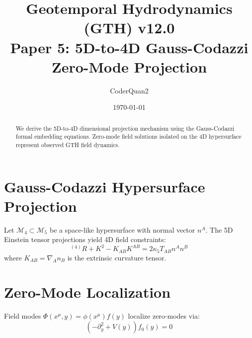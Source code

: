 \documentclass[11pt,a4paper]{article}
\title{\textbf{Geotemporal Hydrodynamics (GTH) v12.0\\Paper 5: 5D-to-4D Gauss-Codazzi Zero-Mode Projection}}
\author{CoderQuan2}
\date{\today}
\begin{document}
\maketitle
\begin{abstract}
We derive the 5D-to-4D dimensional projection mechanism using the Gauss-Codazzi formal embedding equations. Zero-mode field solutions isolated on the 4D hypersurface represent observed GTH field dynamics.
\end{abstract}
\section{Gauss-Codazzi Hypersurface Projection}
Let $\mathcal{M}_4 \subset \mathcal{M}_5$ be a space-like hypersurface with normal vector $n^A$. The 5D Einstein tensor projections yield 4D field constraints:
\begin{equation}
^{(4)}R + K^2 - K_{AB} K^{AB} = 2 \kappa_5 T_{AB} n^A n^B
\end{equation}
where $K_{AB} = \nabla_A n_B$ is the extrinsic curvature tensor.
\section{Zero-Mode Localization}
Field modes $\Phi(x^\mu, y) = \phi(x^\mu) f(y)$ localize zero-modes via:
\begin{equation}
\left( -\partial_y^2 + V(y) \right) f_0(y) = 0
\end{equation}
\end{document}
